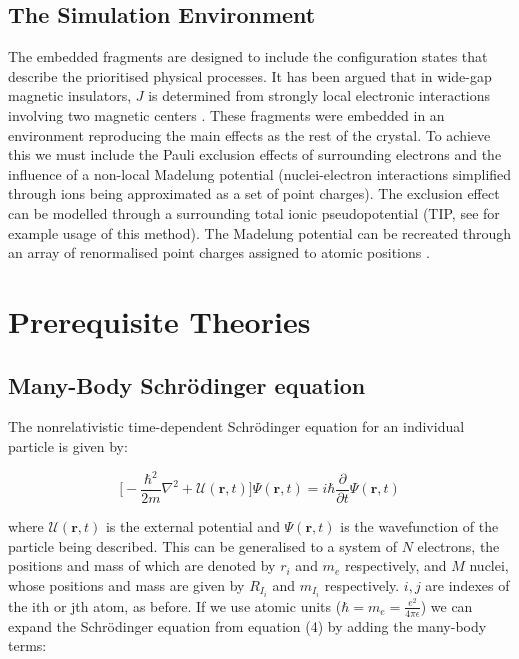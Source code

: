 \documentclass[10pt]{article}
\begin{document}
\subsection{The Simulation Environment}
The embedded fragments are designed to include the configuration states that describe the prioritised physical processes. It has been argued that in wide-gap magnetic insulators, $J$ is determined from strongly local electronic interactions involving two magnetic centers \cite{de1999local}. These fragments were embedded in an environment reproducing the main effects as the rest of the crystal. To achieve this we must include the Pauli exclusion effects of surrounding electrons and the influence of a non-local Madelung potential (nuclei-electron interactions simplified through ions being approximated as a set of point charges). The exclusion effect can be modelled through a surrounding total ionic pseudopotential (TIP, see \cite{winter1987theoretical} for example usage of this method). The Madelung potential can be recreated through an array of renormalised point charges assigned to atomic positions \cite{gelle2008fast}.

\section{Prerequisite Theories}
\subsection{Many-Body Schrödinger equation}
The nonrelativistic time-dependent Schrödinger equation for an individual particle is given by:

\begin{equation}
	\biggr[-\frac{\hbar^2}{2m}\nabla^2+\mathcal{U}(\textbf{r},t)\biggr]\Psi(\textbf{r},t) = i\hbar\frac{\partial}{\partial t}\Psi(\textbf{r},t)
\end{equation}

where $\mathcal{U}(\textbf{r},t)$ is the external potential and $\Psi(\textbf{r},t)$ is the wavefunction of the particle being described. This can be generalised to a system of $N$ electrons, the positions and mass of which are denoted by \textbf{$r_i$} and $m_e$ respectively, and $M$ nuclei, whose positions and mass are given by \textbf{$R_{I_i}$} and $m_{I_i}$ respectively. $i,j$ are indexes of the ith or jth atom, as before. If we use atomic units ($\hbar = m_e = \frac{e^2}{4\pi\epsilon}$) we can expand the Schrödinger equation from equation (4) by adding the many-body terms:
\end{document}
